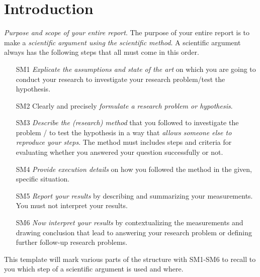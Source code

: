 \documentclass[
  numbers=noenddot,
  english,  %
  a4paper,  %
  twoside,  %
  bibliography=totoc,
  headsepline,
  cleardoublepage=empty,
  parskip=half,
  draft=false
]{scrbook}
\theoremstyle{break}
\begin{document}
\printglossary[type=\acronymtype,title={Abbreviations}]


\renewcommand*{\chapterpagestyle}{scrplain}
\pagestyle{scrheadings}

\chapter{Introduction}\label{sec:introduction}

\emph{Purpose and scope of your entire report}.
The purpose of your entire report is to make a \emph{scientific argument using the scientific method}.
A scientific argument always has the following steps that all must come in this order.
%
\begin{itemize}
  \item[SM1] \emph{Explicate the assumptions and state of the art} on which you are going to conduct your research to investigate your research problem/test the hypothesis.
  \item[SM2] Clearly and precisely \emph{formulate a research problem or hypothesis}.
  \item[SM3] \emph{Describe the (research) method} that you followed to investigate the problem / to test the hypothesis in a way that \emph{allows someone else to reproduce your steps}.
        The method must includes steps and criteria for evaluating whether you answered your question successfully or not.
  \item[SM4] \emph{Provide execution details} on how you followed the method in the given, specific situation.
  \item[SM5] \emph{Report your results} by describing and summarizing your measurements.
        You must not interpret your results.
  \item[SM6] \emph{Now interpret your results} by contextualizing the measurements and drawing conclusion that lead to answering your research problem or defining further follow-up research problems.
\end{itemize}
%
This template will mark various parts of the structure with SM1-SM6 to recall to you which step of a scientific argument is used and where.
\end{document}
